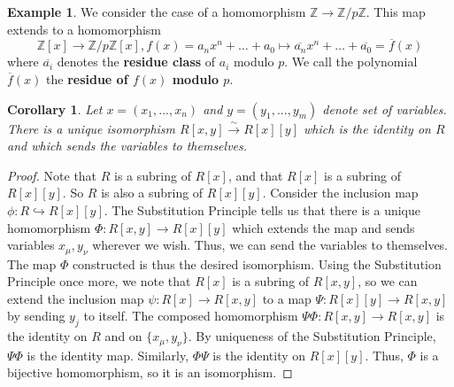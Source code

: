 \documentclass[12pt]{article}
\newtheorem{cor}[thm]{Corollary}
\theoremstyle{definition}
\newtheorem{eg}[thm]{Example}
\theoremstyle{remark}
\numberwithin{equation}{section}
\newcommand\Z{\mathbb Z}    %
\newcommand\B[1]{\textbf{ #1}}
\begin{document}
\vspace{15pt}


\begin{eg}
        We consider the case of a homomorphism $\Z \rightarrow \Z/p\Z$. This map extends to a homomorphism \begin{equation}
                \Z[x] \rightarrow \Z/p\Z[x], f(x) = a_nx^n+\hdots + a_0 \mapsto \overline{a_n}x^n+\hdots + \overline{a_0} = \overline{f}(x)
        \end{equation}
        where $\overline{a_i}$ denotes the \B{residue class} of $a_i$ modulo $p$. We call the polynomial $\overline{f}(x)$ the \B{residue of $f(x)$ modulo $p$}.
\end{eg}

\vspace{15pt}

\begin{cor}
        Let $x = (x_1,...,x_n)$ and $y = (y_1,...,y_m)$ denote set of variables. There is a unique isomorphism $R[x,y] \xrightarrow{\sim}R[x][y]$ which is the identity on $R$ and which sends the variables to themselves.
\end{cor}
\begin{proof}
        Note that $R$ is a subring of $R[x]$, and that $R[x]$ is a subring of $R[x][y]$. So $R$ is also a subring of $R[x][y]$. Consider the inclusion map $\phi:R\hookrightarrow R[x][y]$. The Substitution Principle tells us that there is a unique homomorphism $\Phi:R[x,y] \rightarrow R[x][y]$ which extends the map and sends variables $x_{\mu},y_{\nu}$ wherever we wish. Thus, we can send the variables to themselves. The map $\Phi$ constructed is thus the desired isomorphism. Using the Substitution Principle once more, we note that $R[x]$ is a subring of $R[x,y]$, so we can extend the inclusion map $\psi:R[x] \rightarrow R[x,y]$ to a map $\Psi:R[x][y] \rightarrow R[x,y]$ by sending $y_j$ to itself. The composed homomorphism $\Psi\Phi: R[x,y] \rightarrow R[x,y]$ is the identity on $R$ and on $\{x_{\mu},y_{\nu}\}$. By uniqueness of the Substitution Principle, $\Psi\Phi$ is the identity map. Similarly, $\Phi\Psi$ is the identity on $R[x][y]$. Thus, $\Phi$ is a bijective homomorphism, so it is an isomorphism.
\end{proof}

\vspace{15pt}
\end{document}
